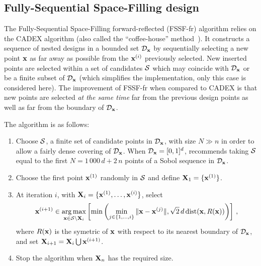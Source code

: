  

\subsection{Fully-Sequential Space-Filling design}\label{sec:FSSF}

The Fully-Sequential Space-Filling forward-reflected (FSSF-fr) algorithm \citep{shang_apley_2020} relies on the CADEX algorithm \citep{kensto69} (also called the ``coffee-house'' method~\citealp{mul07}). 
It constructs a sequence of nested designs in a bounded set $\mathcal{D}_{\bf x}$ by sequentially selecting a new point ${\bf x}$ as far away as possible from the ${\bf x}^{(i)}$ previously selected. 
New inserted points are selected within a set of candidates $\mathcal{S}$ which may coincide with $\mathcal{D}_{\bf x}$ or be a finite subset of $\mathcal{D}_{\bf x}$ (which simplifies the implementation, only this case is considered here). 
The improvement of FSSF-fr when compared to CADEX is that new points are selected {\em at the same time} far from the previous design points as well as far from the boundary of $\mathcal{D}_{\bf x}$. 

The algorithm is as follows:
\begin{enumerate}
  \item Choose $\mathcal{S}$, a finite set of candidate points in $\mathcal{D}_{\bf x}$, with size $N \gg n$ in order to allow a fairly dense covering of $\mathcal{D}_{\bf x}$. 
  When $\mathcal{D}_{\bf x}=[0,1]^d$, \citet{shang_apley_2020} recommends taking $\mathcal{S}$ equal to the first $N=1\,000\,d+2\,n$ points of a Sobol sequence in $\mathcal{D}_{\bf x}$. 
  
  \item Choose the first point ${\bf x}^{(1)}$ randomly in $\mathcal{S}$ and define ${\bf X}_1 = \{{\bf x}^{(1)}\}$. 
  
  \item At iteration $i$, with ${\bf X}_i = \{{\bf x}^{(1)},\ldots, {\bf x}^{(i)}\}$, select
  \begin{equation}\label{eq:FSSF-fr}
    {\bf x}^{(i+1)} \in \operatorname*{arg\,max}_{{\bf x} \in \mathcal{S} \setminus {\bf X}_i} \left[ \min\left( \min_{j \in \{1,\ldots,i\}} \|{\bf x}-{\bf x}^{(j)}\|, \sqrt{2}\,d \,\mbox{dist}({\bf x},R({\bf x})) \right) \right]\,, 
  \end{equation}
  where $R({\bf x})$ is the symetric of ${\bf x}$ with respect to its nearest boundary of $\mathcal{D}_{\bf x}$,
  and set ${\bf X}_{i+1} = {\bf X}_i \bigcup {\bf x}^{(i+1)}$.
  
  \item Stop the algorithm when ${\bf X}_n$ has the required size.
\end{enumerate}

